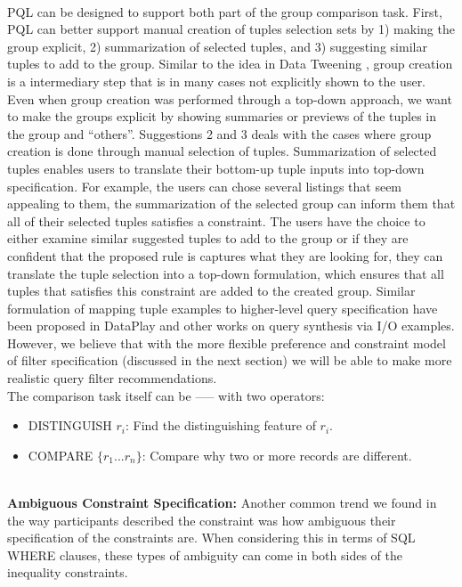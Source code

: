 \documentclass{sig-alternate-05-2015}
\begin{document}
\\ PQL can be designed to support both part of the group comparison task. First, PQL can better support manual creation of tuples selection sets by 1) making the group explicit, 2) summarization of selected tuples, and 3) suggesting similar tuples to add to the group. Similar to the idea in Data Tweening \cite{Khan2017}, group creation is a intermediary step that is in many cases not explicitly shown to the user. Even when group creation was performed through a top-down approach, we want to make the groups explicit by showing summaries or previews of the tuples in the group and ``others''. Suggestions 2 and 3 deals with the cases where group creation is done through manual selection of tuples. Summarization of selected tuples enables users to translate their bottom-up tuple inputs into top-down specification. For example, the users can chose several listings that seem appealing to them, the summarization of the selected group can inform them that all of their selected tuples satisfies a constraint. The users have the choice to either examine similar suggested tuples to add to the group or if they are confident that the proposed rule is captures what they are looking for, they can translate the tuple selection into a top-down formulation, which ensures that all tuples that satisfies this constraint are added to the created group. Similar formulation of mapping tuple examples to higher-level query specification have been proposed in DataPlay\cite{Abouzied2012} and other works on query synthesis via I/O examples\cite{Wang2017,Wang2017a}. However, we believe that with the more flexible preference and constraint model of filter specification (discussed in the next section) we will be able to make more realistic query filter recommendations.
\\ The comparison task itself can be ----- with two operators:
\begin{itemize}
\item DISTINGUISH $r_i$: Find the distinguishing feature of $r_i$.
\item COMPARE $\{r_1 ...r_n\}$: Compare why two or more records are different.
\end{itemize}
\\ \textbf{Ambiguous Constraint Specification:}
Another common trend we found in the way participants described the constraint was how ambiguous their specification of the constraints are. When considering this in terms of SQL WHERE clauses, these types of ambiguity can come in both sides of the inequality constraints. 
\end{document}
